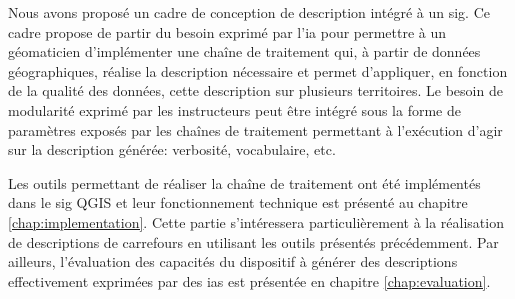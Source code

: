 \newpar{}

Nous avons proposé un cadre de conception de description intégré à un \gls{sig}. Ce cadre propose de partir du besoin exprimé par l'\gls{ia} pour permettre à un géomaticien d'implémenter une chaîne de traitement qui, à partir de données géographiques, réalise la description nécessaire et permet d'appliquer, en fonction de la qualité des données, cette description sur plusieurs territoires. Le besoin de modularité exprimé par les instructeurs peut être intégré sous la forme de paramètres exposés par les chaînes de traitement permettant à l'exécution d'agir sur la description générée: verbosité, vocabulaire, etc. 

\newpar{}

Les outils permettant de réaliser la chaîne de traitement ont été implémentés dans le \gls{sig} QGIS et leur fonctionnement technique est présenté au chapitre \ref{chap:implementation}. Cette partie s'intéressera particulièrement à la réalisation de descriptions de carrefours en utilisant les outils présentés précédemment. Par ailleurs, l'évaluation des capacités du dispositif à générer des descriptions effectivement exprimées par des \glspl{ia} est présentée en chapitre \ref{chap:evaluation}.